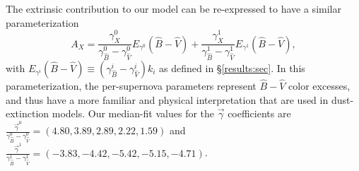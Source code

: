 \documentclass{aastex61}   	%
\begin{document}
The extrinsic contribution to our model can be re-expressed to have a similar parameterization
\begin{equation}
A_X = \frac{\gamma^0_X}{\gamma^0_{\hat{B}}-\gamma^0_{\hat{V}}}  E_{\gamma^0}({\hat{B}}-{\hat{V}}) +  \frac{\gamma^1_X}{\gamma^1_{\hat{B}}-\gamma^1_{\hat{V}}}  E_{\gamma^1}({\hat{B}}-{\hat{V}}),
\end{equation}
with $E_{\gamma^i}({\hat{B}}-{\hat{V}}) \equiv  (\gamma^i_{\hat{B}}-\gamma^i_{\hat{V}})k_i$ as defined in \S\ref{results:sec}.
In this parameterization, the per-supernova parameters represent $\hat{B}-\hat{V}$ color excesses, and thus have a
more familiar and physical interpretation that are used in dust-extinction models.
Our median-fit values for the $\vec{\gamma}$ coefficients are
$\frac{\vec{\gamma}^0}{\gamma^0_{\hat{B}}-\gamma^0_{\hat{V}}}  =(4.80 ,   3.89,   2.89,   2.22,   1.59)$ and
$ \frac{\vec{\gamma}^1}{\gamma^1_{\hat{B}}-\gamma^1_{\hat{V}}}=(-3.83 ,  -4.42,  -5.42,  -5.15,  -4.71)$.
\end{document}
